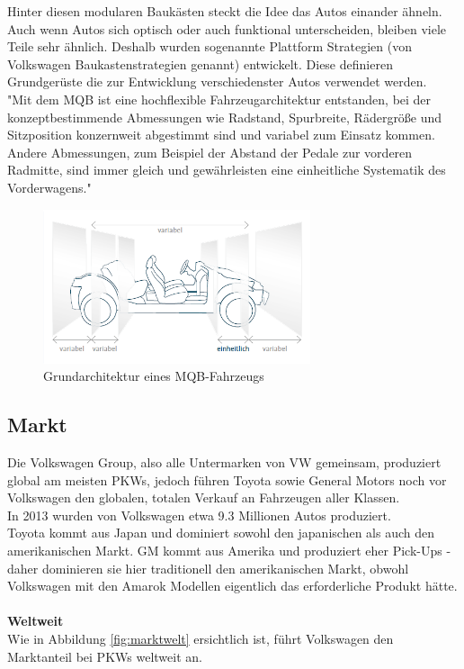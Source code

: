 \documentclass[12pt]{article}
\begin{document}
Hinter diesen modularen Baukästen steckt die Idee das Autos einander ähneln. Auch wenn Autos sich optisch oder auch funktional unterscheiden, bleiben viele Teile sehr ähnlich. Deshalb wurden sogenannte Plattform Strategien (von Volkswagen Baukastenstrategien genannt) entwickelt. Diese definieren Grundgerüste die zur Entwicklung verschiedenster Autos verwendet werden. \\ "Mit dem MQB ist eine hochflexible Fahrzeugarchitektur entstanden, bei der konzeptbestimmende Abmessungen wie Radstand, Spurbreite, Rädergröße und Sitzposition konzernweit abgestimmt sind und variabel zum Einsatz kommen. Andere Abmessungen, zum Beispiel der Abstand der Pedale zur vorderen Radmitte, sind immer gleich und gewährleisten eine einheitliche Systematik des Vorderwagens."\cite{mqb}
\FloatBarrier
\begin{figure}[!h]
	\centering
	\includegraphics[width=0.7\textwidth]{images/MQB2}
	\caption{Grundarchitektur eines MQB-Fahrzeugs \cite{mqbdefault}}
\end{figure}\FloatBarrier
\newpage\newpage
\subsection{Markt}
Die Volkswagen Group, also alle Untermarken von VW gemeinsam, produziert global am meisten PKWs, jedoch führen Toyota sowie General Motors noch vor Volkswagen den globalen, totalen Verkauf an Fahrzeugen aller Klassen. \\
In 2013 wurden von Volkswagen etwa 9.3 Millionen Autos produziert. \\
Toyota kommt aus Japan und dominiert sowohl den japanischen als auch den amerikanischen Markt. GM kommt aus Amerika und produziert eher Pick-Ups - daher dominieren sie hier traditionell den amerikanischen Markt, obwohl Volkswagen mit den Amarok Modellen eigentlich das erforderliche Produkt hätte. 
\\\\\textbf{Weltweit}\\
Wie in Abbildung \ref{fig:marktwelt} ersichtlich ist, führt Volkswagen den Marktanteil bei PKWs weltweit an. 
\end{document}
